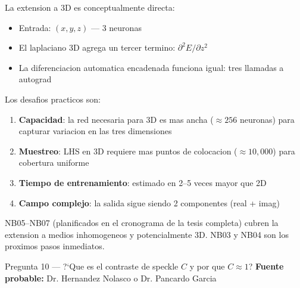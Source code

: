 \begin{answerbox}
La extension a 3D es conceptualmente directa:
\begin{itemize}
  \item Entrada: $(x, y, z)$ --- 3 neuronas
  \item El laplaciano 3D agrega un tercer termino: $\partial^2 E/\partial z^2$
  \item La diferenciacion automatica encadenada funciona igual: tres llamadas a autograd
\end{itemize}

Los desafios practicos son:
\begin{enumerate}
  \item \textbf{Capacidad}: la red necesaria para 3D es mas ancha ($\approx 256$
        neuronas) para capturar variacion en las tres dimensiones
  \item \textbf{Muestreo}: LHS en 3D requiere mas puntos de colocacion ($\approx 10{,}000$)
        para cobertura uniforme
  \item \textbf{Tiempo de entrenamiento}: estimado en 2--5 veces mayor que 2D
  \item \textbf{Campo complejo}: la salida sigue siendo 2 componentes (real + imag)
\end{enumerate}

NB05--NB07 (planificados en el cronograma de la tesis completa) cubren la extension
a medios inhomogeneos y potencialmente 3D. NB03 y NB04 son los proximos pasos
inmediatos.
\end{answerbox}

\vspace{8pt}

\begin{qabox}{Pregunta 10 --- ?`Que es el contraste de speckle $C$ y por que $C \approx 1$?}
\textbf{Fuente probable:} Dr. Hernandez Nolasco o Dr. Pancardo Garcia
\end{qabox}

